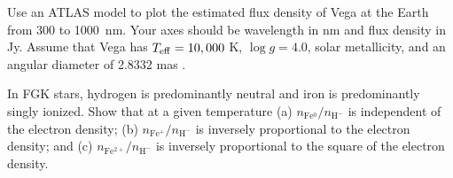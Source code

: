 \begin{problem}
Use an ATLAS model to plot the estimated flux density of Vega at the Earth from 300 to 1000~nm. Your axes should be wavelength in nm and flux density in Jy. Assume that Vega has $T_\mathrm{eff} = 10,000$ K, $\log g = 4.0$, solar metallicity, and an angular diameter of 2.8332 mas \citep{Yoon-2010}.
\end{problem}

\begin{problem}
In FGK stars, hydrogen is predominantly neutral and iron is predominantly singly ionized. Show that at a given temperature (a) $n_\mathrm{Fe^0}/n_\mathrm{H^-}$ is independent of the electron density; (b) $n_\mathrm{Fe^+}/n_\mathrm{H^-}$ is inversely proportional to the electron density; and (c) $n_\mathrm{Fe^{2+}}/n_\mathrm{H^-}$ is inversely proportional to the square of the electron density.
\end{problem}

\problemset

